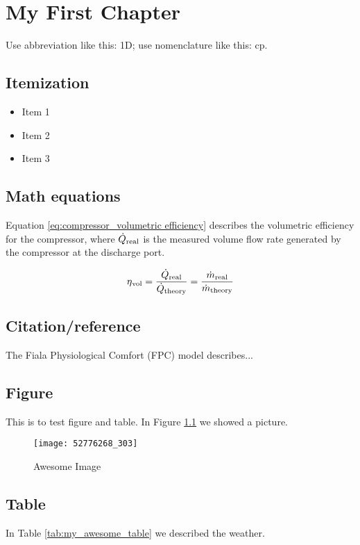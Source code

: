 \chapter{My First Chapter}
\blindtext \blindtext

Use abbreviation like this: \gls{1D}; use nomenclature like this: \gls{cp}.


\section{Itemization}
\begin{itemize}
\item Item 1
\item Item 2
\item Item 3
\end{itemize}


\section{Math equations}
Equation \ref{eq:compressor_volumetric efficiency} describes the volumetric efficiency for the compressor, where $\dot Q \textsubscript{real}$ is the measured volume flow rate generated by the compressor at the discharge port.

\begin{equation}
\label{eq:compressor_volumetric efficiency}
\eta \textsubscript{vol} = \frac{\dot Q \textsubscript{real}}{\dot Q \textsubscript{theory}} = \frac{\dot m \textsubscript{real}}{\dot m \textsubscript{theory}}
\end{equation}


\section{Citation/reference}
The Fiala Physiological Comfort (FPC) model \cite{fialaDynamicSimulationHuman1998} describes...


\section{Figure}
This is to test figure and table. In Figure \ref{fig:awesome_image} we showed a picture.
\begin{figure}[h]
\centering
\texttt{[image: 52776268\_303]}
\caption{Awesome Image}
\label{fig:awesome_image}
\end{figure}

\section{Table}
In Table \ref{tab:my_awesome_table} we described the weather.

